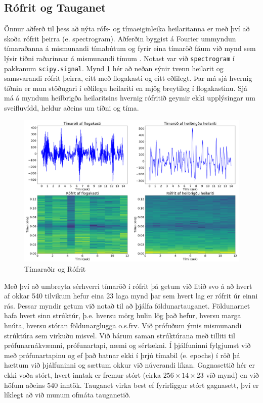 \documentclass[11pt]{article}
\begin{document}
\subsection{Rófrit og Tauganet}
Önnur aðferð til þess að nýta rófs- og tímaeiginleika heilaritanna er með því að skoða rófrit þeirra (e. spectrogram). Aðferðin byggist á Fourier ummyndun tímaraðanna á mismunandi tímabútum og fyrir eina tímaröð fáum við mynd sem lýsir tíðni raðarinnar á mismunandi tímum \cite{nunez2017elegant}. Notast var við {\tt spectrogram} í pakkanum {\tt scipy.signal}. Mynd \ref{rofrit} hér að neðan sýnir tvenn heilarit og samsvarandi rófrit þeirra, eitt með flogakasti og eitt eðlilegt. Þar má sjá hvernig tíðnin er mun stöðugari í eðlilegu heilariti en mjög breytileg í flogakastinu. Sjá má á myndum heilbrigða heilaritsins hvernig rófritið geymir ekki upplýsingar um sveifluvídd, heldur aðeins um tíðni og tíma.

\begin{figure}[h]
    \centering
    \includegraphics[width = \textwidth]{rofrit.png}
    \caption{Tímaraðir og Rófrit}
    \label{rofrit}
\end{figure}

Með því að umbreyta sérhverri tímaröð í rófrit þá getum við litið svo á að hvert af okkar 540 tilvikum hefur eina 23 laga mynd þar sem hvert lag er rófrit úr einni rás. Þessar myndir getum við notað til að þjálfa földunartauganet. 
Földunarnet hafa hvert sinn strúktúr, þ.e. hversu mörg hulin lög það hefur, hversu marga hnúta, hversu stóran földunarglugga o.s.frv. Við prófuðum ýmis mismunandi strúktúra sem virkuðu misvel. Við bárum saman strúktúrana með tilliti til prófunarnákvæmni, prófunartapi, næmi og sértækni. Í þjálfuninni fylgjumst við með prófunartapinu og ef það batnar ekki í þrjú tímabil (e. epochs) í röð þá hættum við þjálfuninni og sættum okkur við núverandi líkan. Gagnasettið hér er ekki voða stórt, hvert inntak er fremur stórt (cirka $256\times 14 \times 23$ víð mynd) en við höfum aðeins 540 inntök. Tauganet virka best ef fyrirliggur stórt gagnasett, því er líklegt að við munum ofmáta tauganetið. 
\end{document}

